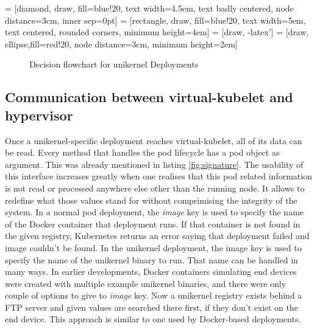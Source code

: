 = [diamond, draw, fill=blue!20, 
    text width=4.5em, text badly centered, node distance=3cm, inner sep=0pt]
 = [rectangle, draw, fill=blue!20, 
    text width=5em, text centered, rounded corners, minimum height=4em]
 = [draw, -latex']
 = [draw, ellipse,fill=red!20, node distance=3cm,
    minimum height=2em]
  \begin{figure}[!h]
    \centering
{}
\caption{Decision flowchart for unikernel Deployments}
\label{fig:deployment-flowchart}
\end{figure}
\subsection{Communication between virtual-kubelet and hypervisor}
Once a unikernel-specific deployment reaches virtual-kubelet, all of its data can be read. Every method that handles the pod lifecycle has a pod object as argument. This was already mentioned in listing \ref{fig:signature}. The usability of this interface increases greatly when one realises that this pod related information is not read or processed anywhere else other than the running node. It allows to redefine what those values stand for without comprimising the integrity of the system. In a normal pod deployment, the \textit{image} key is used to specify the name of the Docker container that deployment runs. If that container is not found in the given registry, Kubernetes returns an error saying that deployment failed and image couldn't be found. In the unikernel deployment, the image key is used to specify the name of the unikernel binary to run. That name can be handled in many ways. In earlier developments, Docker containers simulating end devices were created with multiple example unikernel binaries, and there were only couple of options to give to \textit{image} key. Now a unikernel registry exists behind a FTP server and given values are searched there first, if they don't exist on the end device. This approach is similar to one used by Docker-based deployments.


